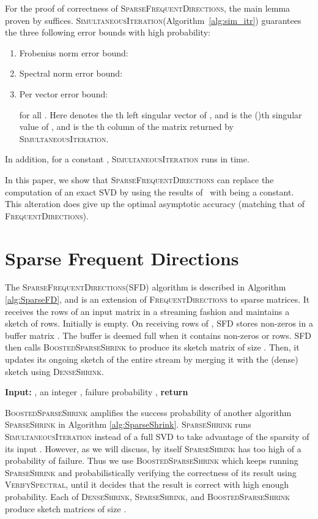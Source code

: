 \documentclass[11pt]{article}
\newcommand{\fd}{\textsc{FrequentDirections}\xspace}
\newcommand{\sfd}{\textsc{SparseFrequentDirections}\xspace}
\newcommand{\SFD}{\textsc{SFD}\xspace}
\newcommand{\si}{\textsc{SimultaneousIteration}\xspace}
\newcommand{\SSh}{\textsc{SparseShrink}\xspace}
\newcommand{\BSSh}{\textsc{BoostedSparseShrink}\xspace}
\newcommand{\DSh}{\textsc{DenseShrink}\xspace}
\newcommand{\vs}{\textsc{VerifySpectral}\xspace}
\begin{document}
For the proof of correctness of \sfd, the main lemma proven by \cite{musco2015stronger} suffices.
\si (Algorithm~\ref{alg:sim_itr}) guarantees the three following error bounds with high probability:
\begin{enumerate}
\item Frobenius norm error bound: 

\item Spectral norm error bound: 

\item Per vector error bound: 


for all . Here  denotes the th left singular vector of , and  is the ()th singular value of , and  is the th column of the matrix  returned by \si.  
\end{enumerate}

In addition, for a constant , \si runs in  time.

In this paper, we show that \sfd can replace the computation of an exact SVD by using the results of~\cite{musco2015stronger} with  being a constant.  This alteration does give up the optimal asymptotic accuracy (matching that of \fd).


\section{Sparse Frequent Directions}
The \sfd (\SFD) algorithm is described in Algorithm \ref{alg:SparseFD}, and is an extension of \fd to sparse matrices.
It receives the rows of an input matrix  in a streaming fashion and maintains a sketch  of  rows. Initially  is empty. 
On receiving rows of , \SFD stores non-zeros in a buffer matrix . 
The buffer is deemed full when it contains  non-zeros or  rows. 
\SFD then calls \BSSh to produce its sketch matrix  of size .
Then, it updates its ongoing sketch  of the entire stream by merging it with the (dense) sketch  using \DSh.
\begin{algorithm}[H]
\caption{\sfd}
\label{alg:SparseFD}
\begin{algorithmic}
\STATE \textbf{Input:} , an integer , failure probability 
\STATE , \; 
\FOR {}
\STATE 
{} \STATE 
\STATE 
\STATE 
\ENDIF
\ENDFOR
\STATE \textbf{return}  \end{algorithmic}
\end{algorithm}

\BSSh amplifies the success probability of another algorithm \SSh in Algorithm \ref{alg:SparseShrink}.   \SSh runs \si instead of a full SVD to take advantage of the sparsity of its input .  However, as we will discuss, by itself \SSh has too high of a probability of failure.  
Thus we use \BSSh which keeps running \SSh and probabilistically verifying the correctness of its result using \vs, until it decides that the result is correct with high enough probability. 
Each of \DSh, \SSh, and \BSSh produce sketch matrices of size .
\end{document}
